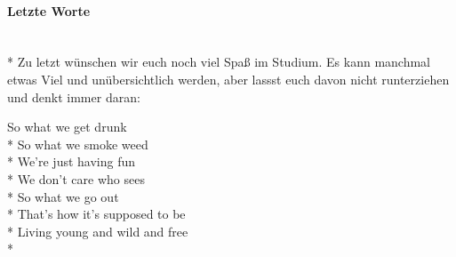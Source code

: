 

\begin{minipage}{\textwidth}
\paragraph{Letzte Worte}\ \\*
Zu letzt wünschen wir euch noch viel Spaß im Studium. Es kann manchmal etwas Viel und unübersichtlich werden, aber lassst euch davon nicht runterziehen und denkt immer daran:\\

\begin{addmargin}[40pt]{0pt} 
So what we get drunk\\*
So what we smoke weed\\*
We’re just having fun\\*
We don’t care who sees\\*
So what we go out\\*
That’s how it's supposed to be\\*
Living young and wild and free\\*
\end{addmargin}
\end{minipage}